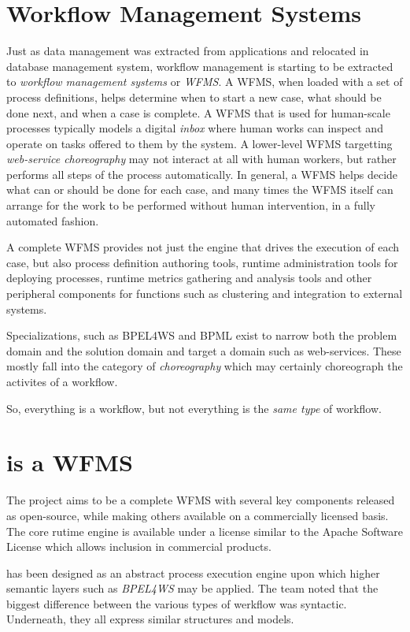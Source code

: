 \section{Workflow Management Systems}

Just as data management was extracted from applications
and relocated in database management system, workflow
management is starting to be extracted to \emph{workflow
management systems} or \emph{WFMS}.  A WFMS, when
loaded with a set of process definitions, helps determine
when to start a new case, what should be done next, and
when a case is complete.  A WFMS that is used for human-scale
processes typically models a digital \emph{inbox} where
human works can inspect and operate on tasks offered to them
by the system.  A lower-level WFMS targetting \emph{web-service
choreography} may not interact at all with human workers, but
rather performs all steps of the process automatically.
In general, a WFMS helps decide what can or should be
done for each case, and many times the WFMS itself can
arrange for the work to be performed without human
intervention, in a fully automated fashion.

A complete WFMS provides not just the engine that drives
the execution of each case, but also process definition 
authoring tools, runtime administration tools for deploying
processes, runtime metrics gathering and analysis tools and other
peripheral components for functions such as clustering and
integration to external systems.

Specializations, such as BPEL4WS and BPML exist to narrow
both the problem domain and the solution domain and target
a domain such as web-services.  These mostly fall into the
category of \emph{choreography} which may certainly
choreograph the activites of a workflow.  

So, everything is a workflow, but not everything is the
\emph{same type} of workflow.

\section{{\werkflow} is a WFMS}

The {\werkflow} project aims to be a complete WFMS with
several key components released as open-source, while making
others available on a commercially licensed basis.  The core
rutime engine is available under a license similar to the
Apache Software License which allows inclusion in commercial
products.

{\werkflow} has been designed as an abstract process execution
engine upon which higher semantic layers such as \emph{BPEL4WS}
may be applied.  The {\werkflow} team noted that the biggest
difference between the various types of werkflow was syntactic.
Underneath, they all express similar structures and models.

